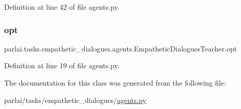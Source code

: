 Definition at line 42 of file agents.\+py.

\mbox{\label{classparlai_1_1tasks_1_1empathetic__dialogues_1_1agents_1_1EmpatheticDialoguesTeacher_aee4f5fe7a72beed0da64501c3b2f98d2}} 
\subsubsection{\texorpdfstring{opt}{opt}}
{\footnotesize\ttfamily parlai.\+tasks.\+empathetic\+\_\+dialogues.\+agents.\+Empathetic\+Dialogues\+Teacher.\+opt}



Definition at line 19 of file agents.\+py.



The documentation for this class was generated from the following file\+:\begin{DoxyCompactItemize}
\item 
parlai/tasks/empathetic\+\_\+dialogues/\hyperlink{parlai_2tasks_2empathetic__dialogues_2agents_8py}{agents.\+py}\end{DoxyCompactItemize}
